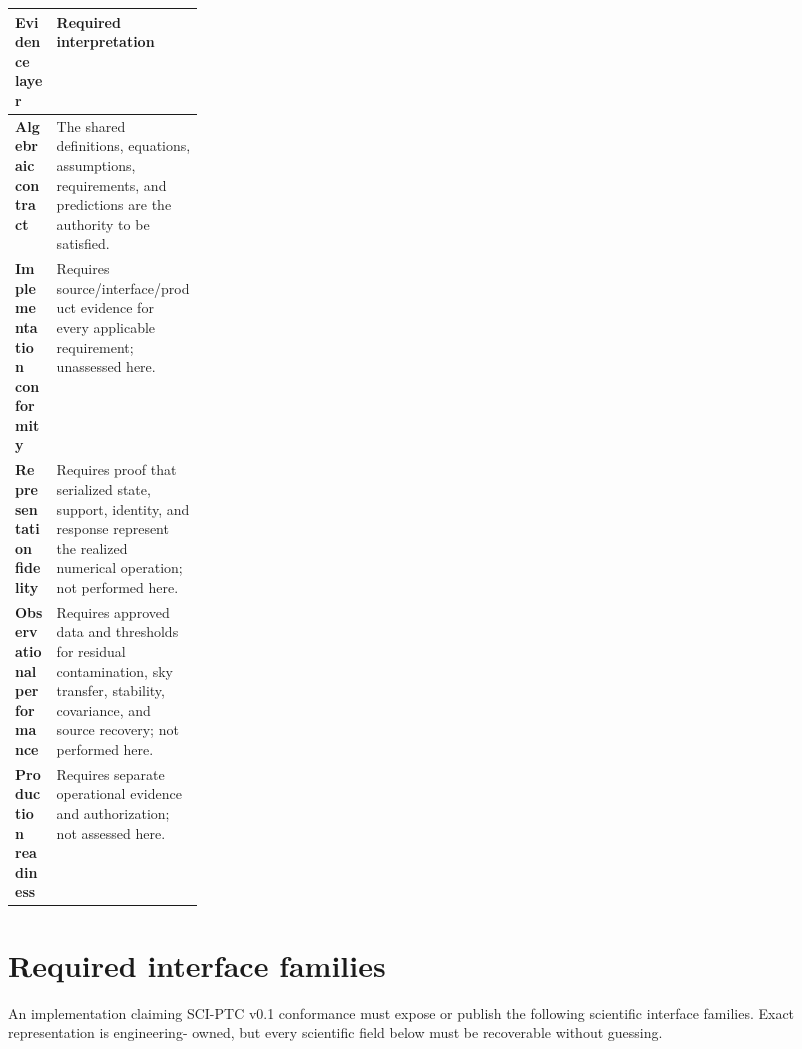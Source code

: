 \documentclass[10pt]{article}
\begin{document}
\begin{table}[h]
\centering
\small
\begin{tabularx}{\linewidth}{>{\bfseries}p{0.22\linewidth}X}
\toprule
Evidence layer & Required interpretation \\
\midrule
Algebraic contract & The shared definitions, equations, assumptions, requirements, and predictions are the authority to be satisfied.\\
Implementation conformity & Requires source/interface/product evidence for every applicable requirement; unassessed here.\\
Representation fidelity & Requires proof that serialized state, support, identity, and response represent the realized numerical operation; not performed here.\\
Observational performance & Requires approved data and thresholds for residual contamination, sky transfer, stability, covariance, and source recovery; not performed here.\\
Production readiness & Requires separate operational evidence and authorization; not assessed here.\\
\bottomrule
\end{tabularx}
\end{table}

\section{Required interface families}
\label{sec:engineering-interfaces}

An implementation claiming SCI-PTC v0.1 conformance must expose or publish the
following scientific interface families. Exact representation is engineering-
owned, but every scientific field below must be recoverable without guessing.
\end{document}
